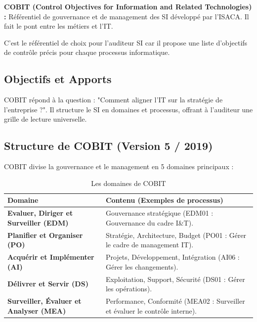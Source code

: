 \begin{boxdef}
\textbf{COBIT (Control Objectives for Information and Related Technologies) :} Référentiel de gouvernance et de management des SI développé par l'ISACA. Il fait le pont entre les métiers et l'IT.
\end{boxdef}

C'est le référentiel de choix pour l'auditeur SI car il propose une liste d'objectifs de contrôle précis pour chaque processus informatique.

\subsection{Objectifs et Apports}

COBIT répond à la question : "Comment aligner l'IT sur la stratégie de l'entreprise ?".
Il structure le SI en domaines et processus, offrant à l'auditeur une grille de lecture universelle.

\subsection{Structure de COBIT (Version 5 / 2019)}

COBIT divise la gouvernance et le management en 5 domaines principaux :

\begin{table}[h!]
\centering
\begin{tabular}{lp{10cm}}
    \toprule
    \textbf{Domaine} & \textbf{Contenu (Exemples de processus)} \\
    \midrule
    \textbf{Evaluer, Diriger et Surveiller (EDM)} & Gouvernance stratégique (EDM01 : Gouvernance du cadre I\&T). \\
    \midrule
    \textbf{Planifier et Organiser (PO)} & Stratégie, Architecture, Budget (PO01 : Gérer le cadre de management IT). \\
    \midrule
    \textbf{Acquérir et Implémenter (AI)} & Projets, Développement, Intégration (AI06 : Gérer les changements). \\
    \midrule
    \textbf{Délivrer et Servir (DS)} & Exploitation, Support, Sécurité (DS01 : Gérer les opérations). \\
    \midrule
    \textbf{Surveiller, Évaluer et Analyser (MEA)} & Performance, Conformité (MEA02 : Surveiller et évaluer le contrôle interne). \\
    \bottomrule
\end{tabular}
\caption{Les domaines de COBIT}
\end{table}

